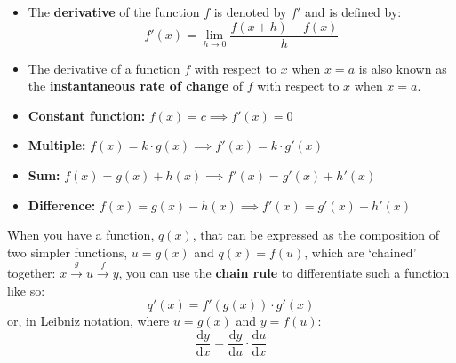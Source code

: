 \documentclass[12pt,a4paper,titlepage]{article}
\newcommand{\diff}[2][]{\frac{\text{d}#1}{\text{d}#2}}
\begin{document}
            \begin{SummaryBox}[title=Differentiation from first principles]
                \begin{itemize}[leftmargin=*]
                    \item The \textbf{derivative} of the function $f$ is denoted by $f'$ and is defined by:
                    \[
                        f'(x) = \lim\limits_{h \to 0} \frac{f(x+h) - f(x)}{h}
                    \]
                    \item The derivative of a function $f$ with respect to $x$ when $x=a$ is also known as the \textbf{instantaneous rate of change} of $f$ with respect to $x$ when $x=a$.
                \end{itemize}
            \end{SummaryBox}
            
            \begin{SummaryBox}[title=Derivative rules]
                \begin{SummaryExtensionBox}[title=Differentiation results]
                    \begin{itemize}[leftmargin=*]
                        \item \textbf{Constant function:} $f(x) = c \implies f'(x) = 0$
                        \item \textbf{Multiple:} $f(x) = k \cdot g(x) \implies f'(x) = k \cdot g'(x)$
                        \item \textbf{Sum:} $f(x) = g(x) + h(x) \implies f'(x) = g'(x) + h'(x)$
                        \item \textbf{Difference:} $f(x) = g(x) - h(x) \implies f'(x) = g'(x) - h'(x)$
                    \end{itemize}
                \end{SummaryExtensionBox}
            \end{SummaryBox}

            \begin{SummaryBox}[title=Chain rule]
                When you have a function, \( q(x) \), that can be expressed as the composition of two simpler functions, \( u = g(x) \) and \( q(x) = f(u) \), which are `chained' together: \( x \xrightarrow{g} u \xrightarrow{f} y \), you can use the \textbf{chain rule} to differentiate such a function like so:
                \[
                    q'(x) = f'(g(x)) \cdot g'(x)
                \]
                or, in Leibniz notation, where \( u = g(x) \) and \( y = f(u) \):
                \[
                    \diff[y]{x} = \diff[y]{u} \cdot \diff[u]{x}
                \]
            \end{SummaryBox}
            
\end{document}

